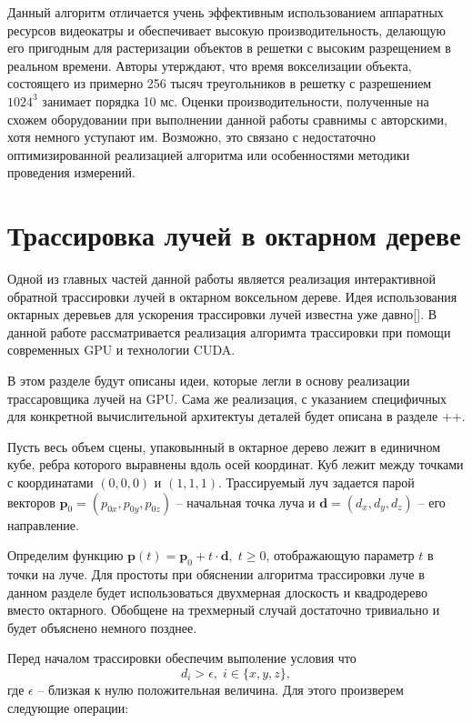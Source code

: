 Данный алгоритм отличается учень эффективным использованием аппаратных ресурсов видеокатры и обеспечивает высокую производительность, делающую его пригодным для растеризации объектов в решетки с высоким разрещением в реальном времени. Авторы утерждают, что время вокселизации объекта, состоящего из примерно 256 тысяч треугольников в решетку с разрешением $1024^3$ занимает порядка 10 мс. Оценки производительности, полученные на схожем оборудовании при выполнении данной работы сравнимы с авторскими, хотя немного уступают им. Возможно, это связано с недостаточно оптимизированной реализацией алгоритма или особенностями методики проведения измерений.

\section{Трассировка лучей в октарном дереве}

Одной из главных частей данной работы является реализация интерактивной обратной трассировки лучей в октарном воксельном дереве. Идея использования октарных деревьев для ускорения трассировки лучей известна уже давно[]. В данной работе рассматривается реализация алгоримта трассировки при помощи современных GPU и технологии CUDA.

В этом разделе будут описаны идеи, которые легли в основу реализации трассаровщика лучей на GPU. Сама же реализация, с указанием специфичных для конкретной вычислительной архитектуы деталей будет описана в разделе ++.

Пусть весь объем сцены, упаковынный в октарное дерево лежит в единичном кубе, ребра которого выравнены вдоль осей координат. Куб лежит между точками с координатами $(0, 0, 0)$ и $(1, 1, 1)$. Трассируемый луч задается парой векторов $\mathbf{p}_0 = (p_{0x}, p_{0y}, p_{0z})$ -- начальная точка луча и $\mathbf{d} = (d_{x}, d_{y}, d_{z})$ -- его направление.

Определим функцию $\mathbf{p}(t) = \mathbf{p}_0 + t\cdot\mathbf{d}, \; t \ge 0$, отображающую параметр $t$ в точки на луче. Для простоты при обяснении алгоритма трассировки луче в данном разделе будет использоваться двухмерная длоскость и квадродерево вместо октарного. Обобщене на трехмерный случай достаточно тривиально и будет объяснено немного позднее.

Перед началом трассировки обеспечим выполение условия
что $$d_i > \epsilon,\; i \in \{x, y, z\},$$ где $\epsilon$ -- близкая к нулю положительная величина. Для этого произверем следующие операции:

